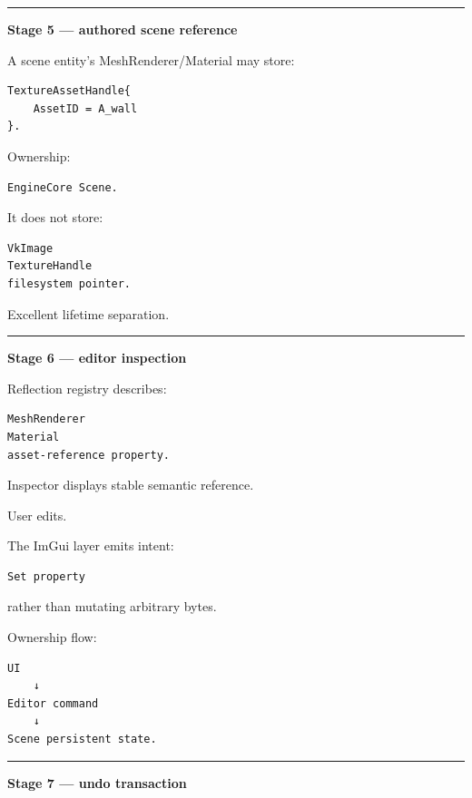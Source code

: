 \begin{center}\rule{0.5\linewidth}{0.5pt}\end{center}

\textbf{Stage 5 --- authored scene reference}

A scene entity's MeshRenderer/Material may store:

\begin{verbatim}
TextureAssetHandle{
    AssetID = A_wall
}.
\end{verbatim}

Ownership:

\begin{verbatim}
EngineCore Scene.
\end{verbatim}

It does not store:

\begin{verbatim}
VkImage
TextureHandle
filesystem pointer.
\end{verbatim}

Excellent lifetime separation.

\begin{center}\rule{0.5\linewidth}{0.5pt}\end{center}

\textbf{Stage 6 --- editor inspection}

Reflection registry describes:

\begin{verbatim}
MeshRenderer
Material
asset-reference property.
\end{verbatim}

Inspector displays stable semantic reference.

User edits.

The ImGui layer emits intent:

\begin{verbatim}
Set property
\end{verbatim}

rather than mutating arbitrary bytes.

Ownership flow:

\begin{verbatim}
UI
    ↓
Editor command
    ↓
Scene persistent state.
\end{verbatim}

\begin{center}\rule{0.5\linewidth}{0.5pt}\end{center}

\textbf{Stage 7 --- undo transaction}

